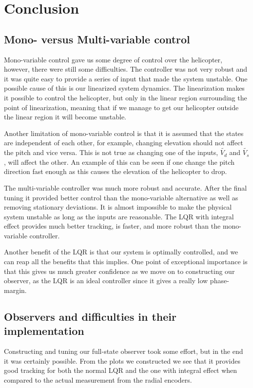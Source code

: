 \section{Conclusion}\label{sec:conclusion}

\subsection{Mono- versus Multi-variable control}
Mono-variable control gave us some degree of control over the helicopter, however, there were still some difficulties. The controller was not very robust and it was quite easy to provide a series of input that made the system unstable. One possible cause of this is our linearized system dynamics. The linearization makes it possible to control the helicopter, but only in the linear region surrounding the point of linearization, meaning that if we manage to get our helicopter outside the linear region it will become unstable.

Another limitation of mono-variable control is that it is assumed that the states are independent of each other, for example, changing elevation should not affect the pitch and vice versa. This is not true as changing one of the inputs, $\tilde{V_d}$ and $\tilde{V_s}$, will affect the other. An example of this can be seen if one change the pitch direction fast enough as this causes the elevation of the helicopter to drop.

The multi-variable controller was much more robust and accurate. After the final tuning it provided better control than the mono-variable alternative as well as removing stationary deviations. It is almost impossible to make the physical system unstable as long as the inputs are reasonable. The LQR with integral effect provides much better tracking, is faster, and more robust than the mono-variable controller.

Another benefit of the LQR is that our system is optimally controlled, and we can reap all the benefits that this implies. One point of exceptional importance is that this gives us much greater confidence as we move on to constructing our observer, as the LQR is an ideal controller since it gives a really low phase-margin\cite{Chen2014}.

\subsection{Observers and difficulties in their implementation}
Constructing and tuning our full-state observer took some effort, but in the end it was certainly possible. From the plots we constructed we see that it provides good tracking for both the normal LQR and the one with integral effect when compared to the actual measurement from the radial encoders.

